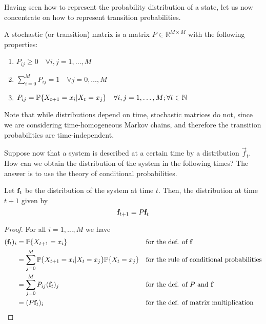 \smallskip
Having seen how to represent the probability distribution of a state, let us now concentrate on how to represent transition probabilities.

\begin{ndef}  \label{def:stoc_matrix}
    A stochastic (or transition) matrix is a matrix $P \in \mathbb{R}^{M\times M}$ with the following properties:
    \begin{center}
        \begin{enumerate}
            \item $P_{ij} \geq 0 \quad \forall i,j = 1,\dots,M$
            \item $\sum_{i = 0}^M P_{ij} = 1 \quad \forall j = 0,\dots,M$ 
            \item $P_{ij} = \mathbb{P}\{X_{t+1} = x_i | X_t = x_j \} \quad \forall i,j = 1,\dots,M; \forall t\in \mathbb N$
        \end{enumerate}
    \end{center}
\end{ndef}

Note that while distributions depend on time, stochastic matrices do not, since we are considering time-homogeneous Markov chains, and therefore the transition probabilities are time-independent.

\smallskip
Suppose now that a system is described at a certain time by a distribution $\vec{f}_t$. How can we obtain the distribution of the system in the following times? The answer is to use the theory of conditional probabilities.

\begin{theorem} \label{th:evolution_simple}
    Let $\mathbf{f}_t$ be the distribution of the system at time $t$. Then, the distribution at time $t + 1$ given by
    \begin{equation}
        \mathbf{f}_{t+1} = P \mathbf{f}_t
    \end{equation}
\end{theorem}
\begin{proof}
    For all $i = 1,\dots,M$ we have
    \begin{align}
        (\mathbf{f}_t)_i 
            & = \mathbb{P}\{X_{t+1} = x_i \} && \text{for the def. of $\mathbf{f}$}\\
            & = \sum_{j = 0}^M \mathbb{P}\{X_{t+1} = x_i | X_t = x_j\} \mathbb{P}\{X_t = x_j\} && \text{for the rule of conditional probabilities}\\
            & = \sum_{j = 0}^M P_{ij} (\mathbf{f}_t)_j && \text{for the def. of $P$ and $\mathbf{f}$} \label{eq:matmul1}\\
            & = (P \mathbf{f}_t)_i && \text{for the def. of matrix multiplication} \label{eq:matmul2}
    \end{align}

\end{proof}


